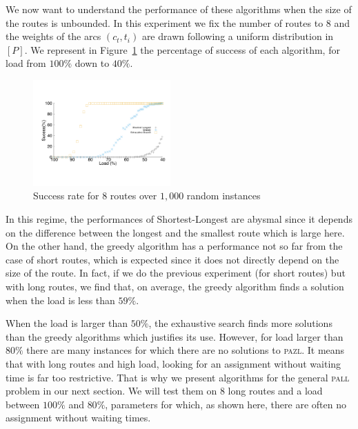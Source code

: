 \documentclass[10pt, conference, letterpaper]{IEEEtran}
\newcommand\pazl{\textsc{pazl}\xspace}
\newcommand\pall{\textsc{pall}\xspace}
\begin{document}
      We now want to understand the performance of these algorithms when the size of the routes is unbounded. In this experiment we fix the number of routes to $8$ and the weights of the arcs $(c_t,t_i)$ are drawn following a uniform distribution in $[P]$. We represent in Figure~\ref{fig:long} the percentage of success of each algorithm, for load from $100\%$ down to $40\%$.
      
\begin{figure}[h]

       \begin{center}
      \includegraphics[width=0.47\textwidth]{echec_longues.pdf}
      \end{center}
       
      \caption{Success rate for $8$ routes over $1,000$ random instances}\label{fig:long}
     \end{figure}
      
      In this regime, the performances of Shortest-Longest are abysmal since it depends on the difference between the longest and the smallest route which is large here. On the other hand, the greedy algorithm has a performance not so far from the case of short routes, which is expected since it does not directly depend on the size of the route. In fact, if we do the previous experiment  (for short routes) but with long routes, we find that, on average, the greedy algorithm finds a solution when the load is less than $59\%$.
      
      When the load is larger than $50\%$, the exhaustive search finds more solutions than the greedy algorithms which justifies its use. However, for load larger than $80\%$ there are many instances for which there are no solutions to \pazl.
      It means that with long routes and high load, looking for an assignment without waiting time is far too restrictive. That is why we present algorithms for the general \pall problem in our next section. We will test them on $8$ long routes and a load between $100\%$ and $80\%$, parameters for which, as shown here, there are often no assignment without waiting times.
      
\end{document}
